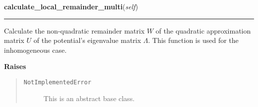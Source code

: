     \label{MatrixPotential:MatrixPotential:calculate_local_remainder_multi}

    \vspace{0.5ex}

\hspace{.8\funcindent}\begin{boxedminipage}{\funcwidth}

    \raggedright \textbf{calculate\_local\_remainder\_multi}(\textit{self})

    \vspace{-1.5ex}

    \rule{\textwidth}{0.5\fboxrule}
\setlength{\parskip}{2ex}
    Calculate the non-quadratic remainder matrix $W$ of the quadratic
    approximation matrix $U$ of the potential's eigenvalue matrix
    $\Lambda$. This function is used for the inhomogeneous
    case.

\setlength{\parskip}{1ex}
      \textbf{Raises}
    \vspace{-1ex}

      \begin{quote}
        \begin{description}

          \item[\texttt{NotImplementedError}]

          This is an abstract base class.

        \end{description}

      \end{quote}

    \end{boxedminipage}

